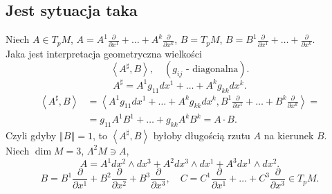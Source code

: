 \documentclass[../main.tex]{subfiles}
\begin{document}
\subsection{Jest sytuacja taka}
Niech $A\in T_pM$,  $A = A^1 \frac{\partial }{\partial x^1} + \ldots + A^k \frac{\partial }{\partial x^k} $, $B = T_pM$, $B = B^1 \frac{\partial }{\partial x^1} + \ldots + \frac{\partial }{\partial x^k}$.\\
Jaka jest interpretacja geometryczna wielkości
\[
    \left<A^\sharp, B \right>,\quad (g_{ij}\text{ - diagonalna})
.\]
\[
A^\sharp = A^1g_{11}dx^1 + \ldots + A^kg_{kk}dx^k
.\]
\begin{align*}
    \left<A^\sharp, B \right> &= \left<A^1g_{11}dx^1 + \ldots + A^k g_{kk}dx^k, B^1 \frac{\partial }{\partial x^1} + \ldots + B^k \frac{\partial }{\partial x^k}  \right> = \\
    &=  g_{11}A^1B^1 + \ldots + g_{kk}A^kB^k = A\cdot B
.\end{align*}
Czyli gdyby $\left\Vert B \right\Vert = 1$, to $\left<A^\sharp, B \right>$ byłoby długością rzutu $A$ na kierunek $B$.\\
Niech $\dim M = 3$, $\Lambda^2M\ni A$,
\[
A = A^1 dx^2\land dx^3 + A^2dx^3\land dx^1 + A^3dx^1\land dx^2
.\]
\[
B = B^1 \frac{\partial }{\partial x^1} + B^2 \frac{\partial }{\partial x^2} + B^3 \frac{\partial }{\partial x^3},\quad C = C^1 \frac{\partial }{\partial x^1} + \ldots + C^3 \frac{\partial }{\partial x^3} \in T_pM
.\]
\end{document}
